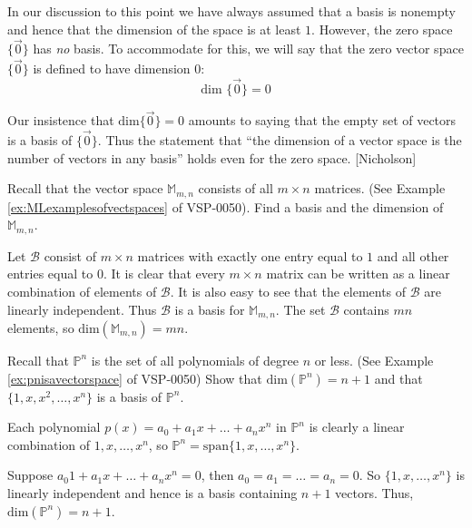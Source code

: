 \documentclass{ximera}
\begin{document}
In our discussion to this point we have always assumed that a basis is nonempty and hence that the dimension of the space is at least $1$. However, the zero space $\{\vec{0}\}$ has {\it no} basis.  To accommodate for this, we will say that the zero vector space $\{\vec{0}\}$ is defined to have dimension $0$:
\begin{equation*}
\mbox{dim }\{\vec{0}\} = 0
\end{equation*}

Our insistence that $\mbox{dim}\{\vec{0}\} = 0$ amounts to saying that the empty set of vectors is a basis of $\{\vec{0}\}$. Thus the statement that ``the dimension of a vector space is the number of vectors in any basis'' holds even for the zero space. [Nicholson]

\begin{example}\label{ex:dimofM}
Recall that the vector space $\mathbb{M}_{m,n}$ consists of all $m\times n$ matrices. (See Example \ref{ex:MLexamplesofvectspaces} of VSP-0050).  Find a basis and the dimension of $\mathbb{M}_{m,n}$.
\begin{explanation}
Let $\mathcal{B}$ consist of $m\times n$ matrices 
 with exactly one entry equal to $1$ and all other entries equal to $0$. It is clear that every $m\times n$ matrix can be written as a linear combination of elements of $\mathcal{B}$.  It is also easy to see that the elements of $\mathcal{B}$ are linearly independent.  Thus $\mathcal{B}$ is a basis for $\mathbb{M}_{m,n}$.  The set $\mathcal{B}$ contains $mn$ elements, so $\mbox{dim}(\mathbb{M}_{m,n})=mn$.
\end{explanation}
\end{example}

\begin{example}\label{ex:dimofP}
Recall that $\mathbb{P}^n$ is the set of all polynomials of degree $n$ or less.  (See Example \ref{ex:pnisavectorspace} of VSP-0050) Show that $\mbox{dim}( \mathbb{P}^{n}) = n + 1$ and that $\{1, x, x^{2}, \dots, x^{n}\}$ is a basis of $\mathbb{P}^{n}$.

\begin{explanation}
Each polynomial $p(x) = a_{0} + a_{1}x + \ldots + a_{n}x^{n}$ in $\mathbb{P}^{n}$ is clearly a linear combination of $1, x, \dots, x^{n}$, so $\mathbb{P}^{n} = \mbox{span}\{1, x, \dots, x^{n}\}$. 

Suppose $a_{0}1 + a_{1}x + \dots + a_{n}x^{n} = 0$, then $a_{0} = a_{1} = \ldots = a_{n} = 0$. So $\{1, x, \dots, x^{n}\}$ is linearly independent and hence is a basis containing $n + 1$ vectors. Thus, $\mbox{dim}(\mathbb{P}^{n}) = n + 1$.
\end{explanation}
\end{example}
\end{document}

